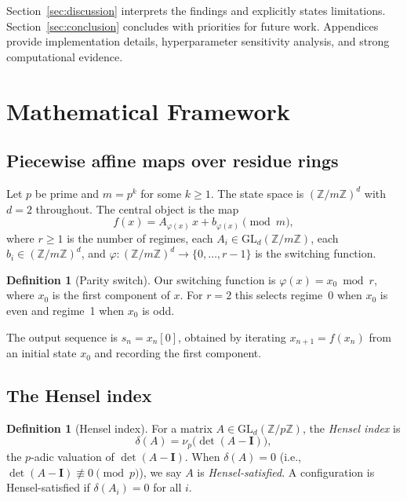 \documentclass[11pt]{article}
\theoremstyle{plain}
\theoremstyle{definition}
\newtheorem{definition}[theorem]{Definition}
\newcommand{\Z}{\mathbb{Z}}
\newcommand{\vp}{\nu_p}
\newcommand{\GL}{\mathrm{GL}}
\newcommand{\Id}{\mathbf{I}}
\begin{document}
Section~\ref{sec:discussion} interprets the findings and explicitly states limitations. Section~\ref{sec:conclusion} concludes with priorities for future work. Appendices provide implementation details, hyperparameter sensitivity analysis, and strong computational evidence.


\section{Mathematical Framework}
\label{sec:framework}

\subsection{Piecewise affine maps over residue rings}

Let $p$ be prime and $m = p^k$ for some $k \geq 1$. The state space is $(\Z/m\Z)^d$ with $d = 2$ throughout. The central object is the map
\begin{equation}
  \label{eq:map}
  f(x) = A_{\varphi(x)}\,x + b_{\varphi(x)} \pmod{m},
\end{equation}
where $r \geq 1$ is the number of regimes, each $A_i \in \GL_d(\Z/m\Z)$, each $b_i \in (\Z/m\Z)^d$, and $\varphi\colon (\Z/m\Z)^d \to \{0,\ldots,r-1\}$ is the switching function.

\begin{definition}[Parity switch]
Our switching function is $\varphi(x) = x_0 \bmod r$, where $x_0$ is the first component of $x$. For $r=2$ this selects regime~0 when $x_0$ is even and regime~1 when $x_0$ is odd.
\end{definition}

The output sequence is $s_n = x_n[0]$, obtained by iterating $x_{n+1} = f(x_n)$ from an initial state $x_0$ and recording the first component.

\subsection{The Hensel index}

\begin{definition}[Hensel index]
\label{def:hensel}
For a matrix $A \in \GL_d(\Z/p\Z)$, the \emph{Hensel index} is
\[
  \delta(A) = \vp\bigl(\det(A - \Id)\bigr),
\]
the $p$-adic valuation of $\det(A - \Id)$. When $\delta(A) = 0$ (i.e., $\det(A-\Id) \not\equiv 0 \pmod p$), we say $A$ is \emph{Hensel-satisfied}. A configuration is Hensel-satisfied if $\delta(A_i) = 0$ for all $i$.
\end{definition}
\end{document}

